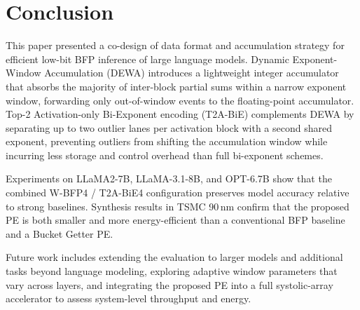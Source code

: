 \section{Conclusion}
\label{sec:conclusion}

This paper presented a co-design of data format and accumulation strategy for efficient low-bit BFP inference of large language models.
Dynamic Exponent-Window Accumulation (DEWA) introduces a lightweight integer accumulator that absorbs the majority of inter-block partial sums within a narrow exponent window, forwarding only out-of-window events to the floating-point accumulator.
Top-2 Activation-only Bi-Exponent encoding (T2A-BiE) complements DEWA by separating up to two outlier lanes per activation block with a second shared exponent, preventing outliers from shifting the accumulation window while incurring less storage and control overhead than full bi-exponent schemes.

Experiments on LLaMA2-7B, LLaMA-3.1-8B, and OPT-6.7B show that the combined W-BFP4 / T2A-BiE4 configuration preserves model accuracy relative to strong baselines.
Synthesis results in TSMC 90\,nm confirm that the proposed PE is both smaller and more energy-efficient than a conventional BFP baseline and a Bucket Getter PE.

Future work includes extending the evaluation to larger models and additional tasks beyond language modeling, exploring adaptive window parameters that vary across layers, and integrating the proposed PE into a full systolic-array accelerator to assess system-level throughput and energy.

